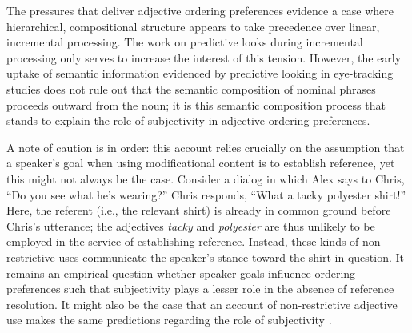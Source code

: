 \documentclass[preprint,authoryear]{elsarticle}\frenchspacing
\newcommand{\jd}[1]{\textcolor{Blue}{[jd: #1]}}
\newcommand{\gcs}[1]{\textcolor{blue}{[gcs: #1]}}
\begin{document}
The pressures that deliver adjective ordering preferences evidence a case where hierarchical, compositional structure appears to take precedence over linear, incremental processing. The work on predictive looks during incremental processing only serves to increase the interest of this tension. However, the early uptake of semantic information evidenced by predictive looking in eye-tracking studies does not rule out that the semantic composition of nominal phrases proceeds outward from the noun; it is this semantic composition process that stands to explain the role of subjectivity in adjective ordering preferences. 


A note of caution is in order: this account relies crucially on the assumption that a speaker's goal when using modificational content is to establish reference, yet this might not always be the case.  Consider a dialog in which Alex says to Chris, ``Do you see what he's wearing?'' Chris responds, ``What a tacky polyester shirt!'' Here, the referent (i.e., the relevant shirt) is already in common ground before Chris's utterance; the adjectives \emph{tacky} and \emph{polyester} are thus unlikely to be employed in the service of establishing reference. Instead, these kinds of non-restrictive uses communicate the speaker's stance toward the shirt in question. It remains an empirical question whether speaker goals influence ordering preferences such that subjectivity plays a lesser role in the absence of reference resolution. It might also be the case that an account of non-restrictive adjective use makes the same predictions regarding the role of subjectivity \citep[cf.][]{hahnetal2018}. %
\end{document}

